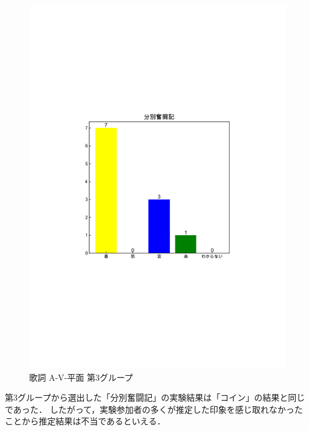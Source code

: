 \begin{figure}[H]
    \centering
    \includegraphics[width=14cm]{4321.pdf}
    \vspace{-1mm}
    \caption{歌詞 A-V-平面 第3グループ}
    \label{fig:mms}
    \vspace{5mm}
\end{figure}
第3グループから選出した「分別奮闘記」の実験結果は「コイン」の結果と同じであった．
したがって，実験参加者の多くが推定した印象を感じ取れなかったことから推定結果は不当であるといえる．
\newpage
